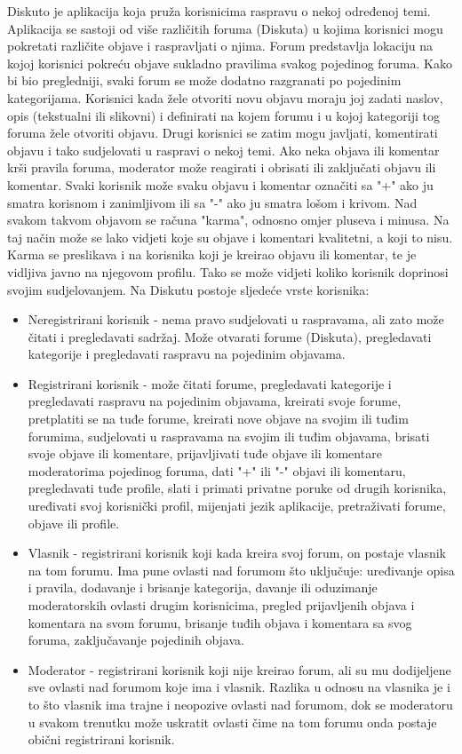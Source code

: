 \documentclass{foi}
\begin{document}
Diskuto je aplikacija koja pruža korisnicima raspravu o nekoj određenoj temi. Aplikacija se sastoji od više različitih foruma (Diskuta) u kojima korisnici mogu pokretati različite objave i raspravljati o njima. Forum predstavlja lokaciju na kojoj korisnici pokreću objave sukladno pravilima svakog pojedinog foruma. Kako bi bio pregledniji, svaki forum se može dodatno razgranati po pojedinim kategorijama. Korisnici kada žele otvoriti novu objavu moraju joj zadati naslov, opis (tekstualni ili slikovni) i definirati na kojem forumu i u kojoj kategoriji tog foruma žele otvoriti objavu. Drugi korisnici se zatim mogu javljati, komentirati objavu i tako sudjelovati u raspravi o nekoj temi. Ako neka objava ili komentar krši pravila foruma, moderator može reagirati i obrisati ili zaključati objavu ili komentar. Svaki korisnik može svaku objavu i komentar označiti sa "+" ako ju smatra korisnom i zanimljivom ili sa "-" ako ju smatra lošom i krivom. Nad svakom takvom objavom se računa "karma", odnosno omjer pluseva i minusa. Na taj način može se lako vidjeti koje su objave i komentari kvalitetni, a koji to nisu. Karma se preslikava i na korisnika koji je kreirao objavu ili komentar, te je vidljiva javno na njegovom profilu. Tako se može vidjeti koliko korisnik doprinosi svojim sudjelovanjem. Na Diskutu postoje sljedeće vrste korisnika:

\begin{itemize}
\item Neregistrirani korisnik - nema pravo sudjelovati u raspravama, ali zato može čitati i pregledavati sadržaj. Može otvarati forume (Diskuta), pregledavati kategorije i pregledavati raspravu na pojedinim objavama.
\item Registrirani korisnik - može čitati forume, pregledavati kategorije i pregledavati raspravu na pojedinim objavama, kreirati svoje forume, pretplatiti se na tuđe forume, kreirati nove objave na svojim ili tuđim forumima, sudjelovati u raspravama na svojim ili tuđim objavama, brisati svoje objave ili komentare, prijavljivati tuđe objave ili komentare moderatorima pojedinog foruma, dati "+" ili "-" objavi ili komentaru, pregledavati tuđe profile, slati i primati privatne poruke od drugih korisnika, uređivati svoj korisnički profil, mijenjati jezik aplikacije, pretraživati forume, objave ili profile.
\item Vlasnik - registrirani korisnik koji kada kreira svoj forum, on postaje vlasnik na tom forumu. Ima pune ovlasti nad forumom što uključuje: uređivanje opisa i pravila, dodavanje i brisanje kategorija, davanje ili oduzimanje moderatorskih ovlasti drugim korisnicima, pregled prijavljenih objava i komentara na svom forumu, brisanje tuđih objava i komentara sa svog foruma, zaključavanje pojedinih objava.
\item Moderator - registrirani korisnik koji nije kreirao forum, ali su mu dodijeljene sve ovlasti nad forumom koje ima i vlasnik. Razlika u odnosu na vlasnika je i to što vlasnik ima trajne i neopozive ovlasti nad forumom, dok se moderatoru u svakom trenutku može uskratit ovlasti čime na tom forumu onda postaje obični registrirani korisnik.
\end{itemize}
\end{document}
